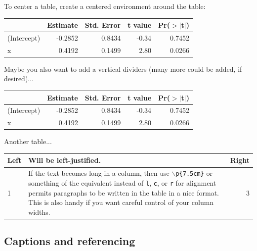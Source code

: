 \documentclass[11pt]{article} %
\begin{document}
To center a table, create a centered environment around the table:
\begin{center} %
\begin{tabular}{l  rrrr} %
  \hline %
 		           & Estimate & Std. Error & t value & Pr($>$$|$t$|$) \\
  \hline
(Intercept) & -0.2852   & 0.8434     & -0.34    & 0.7452 \\
x                & 0.4192    & 0.1499     & 2.80     & 0.0266 \\
   \hline
\end{tabular}
\end{center} %

Maybe you also want to add a vertical dividers (many more could be added, if desired)...

\begin{center}
\begin{tabular}{l | rrrr} %
  \hline
   \hline %
 & Estimate & Std. Error & t value & Pr($>$$|$t$|$) \\
  \hline
(Intercept) & -0.2852 & 0.8434 & -0.34 & 0.7452 \\
  x & 0.4192 & 0.1499 & 2.80 & 0.0266 \\
   \hline
   \hline
\end{tabular}
\end{center}

Another table...
\begin{center}
\begin{tabular}{lp{7.5cm}r}
\hline
Left & Will be left-justified. & Right \\
\hline
1 & If the text becomes long in a column, then use \texttt{$\backslash$p\{7.5cm\}} or something of the equivalent instead of \texttt{l}, \texttt{c}, or \texttt{r} for alignment permits paragraphs to be written in the table in a nice format. This is also handy if you want careful control of your column widths. & 3 \\
\hline
\end{tabular}
\end{center}


\subsection{Captions and referencing}
\end{document}
